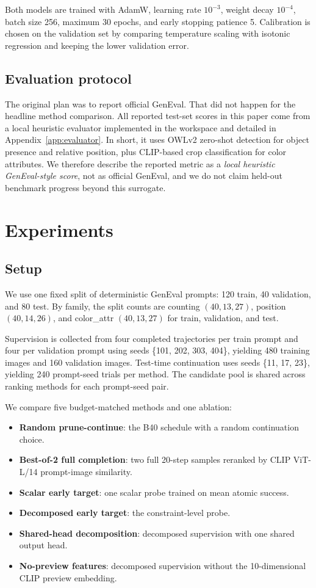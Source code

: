 \documentclass{article}
\newcommand{\budget}{B40}
\begin{document}
Both models are trained with AdamW, learning rate $10^{-3}$, weight decay $10^{-4}$, batch size 256, maximum 30 epochs, and early stopping patience 5. Calibration is chosen on the validation set by comparing temperature scaling with isotonic regression and keeping the lower validation error.

\subsection{Evaluation protocol}
The original plan was to report official GenEval. That did not happen for the headline method comparison. All reported test-set scores in this paper come from a local heuristic evaluator implemented in the workspace and detailed in Appendix~\ref{app:evaluator}. In short, it uses OWLv2 zero-shot detection for object presence and relative position, plus CLIP-based crop classification for color attributes. We therefore describe the reported metric as a \emph{local heuristic GenEval-style score}, not as official GenEval, and we do not claim held-out benchmark progress beyond this surrogate.

\section{Experiments}
\label{sec:experiments}
\subsection{Setup}
We use one fixed split of deterministic GenEval prompts: 120 train, 40 validation, and 80 test. By family, the split counts are counting $(40,13,27)$, position $(40,14,26)$, and color\_attr $(40,13,27)$ for train, validation, and test.

Supervision is collected from four completed trajectories per train prompt and four per validation prompt using seeds \{101, 202, 303, 404\}, yielding 480 training images and 160 validation images. Test-time continuation uses seeds \{11, 17, 23\}, yielding 240 prompt-seed trials per method. The candidate pool is shared across ranking methods for each prompt-seed pair.

We compare five budget-matched methods and one ablation:
\begin{itemize}
  \item \textbf{Random prune-continue}: the \budget{} schedule with a random continuation choice.
  \item \textbf{Best-of-2 full completion}: two full 20-step samples reranked by CLIP ViT-L/14 prompt-image similarity.
  \item \textbf{Scalar early target}: one scalar probe trained on mean atomic success.
  \item \textbf{Decomposed early target}: the constraint-level probe.
  \item \textbf{Shared-head decomposition}: decomposed supervision with one shared output head.
  \item \textbf{No-preview features}: decomposed supervision without the 10-dimensional CLIP preview embedding.
\end{itemize}
\end{document}

